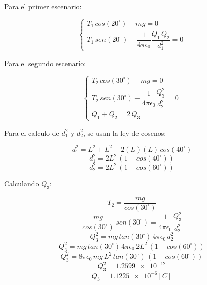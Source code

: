 \documentclass[letter,11pt]{article}
\begin{document}
\begin{enumerate}
Para el primer escenario:

\begin{equation*}
    \begin{cases}
        T_1\,cos(20^\circ)-mg = 0 \\
        T_1\,sen(20^\circ)-\dfrac{1}{4\pi\epsilon_0}\dfrac{Q_1\,Q_2}{d^2_1} = 0
    \end{cases}
\end{equation*}

Para el segundo escenario:

\begin{equation*}
    \begin{cases}
        T_2\,cos(30^\circ)-mg = 0 \\
        T_2\,sen(30^\circ)-\dfrac{1}{4\pi\epsilon_0}\dfrac{Q^2_3}{d^2_2} = 0 \\
        Q_1+Q_2 = 2\,Q_3
    \end{cases}
\end{equation*}

Para el calculo de $d^2_1$ y $d^2_2$, se usan la ley de cosenos:

\begin{equation*}
    d^2_1 = L^2+L^2-2(L)(L)\,cos(40^\circ)
\end{equation*}
\begin{equation*}
    d^2_1 = 2L^2\,(1-cos(40^\circ))
\end{equation*}
\begin{equation*}
    d^2_2 = 2L^2\,(1-cos(60^\circ))
\end{equation*}

Calculando $Q_3$:

\begin{equation*}
    T_2 = \frac{mg}{cos(30^\circ)}
\end{equation*}
\begin{equation*}
    \frac{mg}{cos(30^\circ)}\,sen(30^\circ) = \frac{1}{4\pi\epsilon_0}\frac{Q^2_3}{d^2_2}
\end{equation*}
\begin{equation*}
    Q^2_3 = mg\,tan(30^\circ)\,4\pi\epsilon_0\,d^2_2
\end{equation*}
\begin{equation*}
    Q^2_3 = mg\,tan(30^\circ)\,4\pi\epsilon_0\,2L^2\,(1-cos(60^\circ))
\end{equation*}
\begin{equation*}
    Q^2_3 = 8\pi\epsilon_0\,mg\,L^2\,tan(30^\circ)\,(1-cos(60^\circ))
\end{equation*}
\begin{equation*}
    Q^2_3 = \num{1.2599e-12}
\end{equation*}
\begin{equation*}
    Q_3 = \num{1.1225e-6} [C]
\end{equation*}


\end{enumerate}
\end{document}
